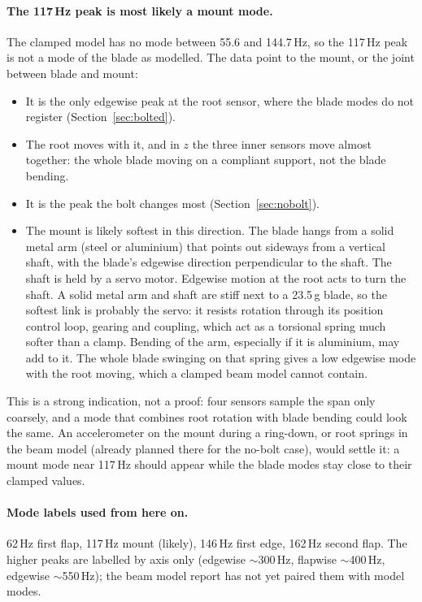 \documentclass[11pt]{article}
\begin{document}
\paragraph{The 117\,Hz peak is most likely a mount mode.} The clamped model
has no mode between 55.6 and 144.7\,Hz, so the 117\,Hz peak is not a mode of
the blade as modelled. The data point to the mount, or the joint between
blade and mount:
\begin{itemize}
  \item It is the only edgewise peak at the root sensor, where the blade
        modes do not register (Section~\ref{sec:bolted}).
  \item The root moves with it, and in $z$ the three inner sensors move
        almost together: the whole blade moving on a compliant support, not
        the blade bending.
  \item It is the peak the bolt changes most (Section~\ref{sec:nobolt}).
  \item The mount is likely softest in this direction. The blade hangs from
        a solid metal arm (steel or aluminium) that points out sideways from
        a vertical shaft, with the blade's edgewise direction perpendicular to
        the shaft. The shaft is held by a servo motor. Edgewise motion at the
        root acts to turn the shaft. A solid metal arm and shaft are stiff
        next to a 23.5\,g blade, so the softest link is probably the servo:
        it resists rotation through its position control loop, gearing and
        coupling, which act as a torsional spring much softer than a clamp.
        Bending of the arm, especially if it is aluminium, may add to it. The whole blade swinging on that spring gives a
        low edgewise mode with the root moving, which a clamped beam model
        cannot contain.
\end{itemize}
This is a strong indication, not a proof: four sensors sample the span only
coarsely, and a mode that combines root rotation with blade bending could
look the same. An accelerometer on the mount during a ring-down, or root
springs in the beam model (already planned there for the no-bolt case),
would settle it: a mount mode near 117\,Hz should appear while the blade
modes stay close to their clamped values.

\paragraph{Mode labels used from here on.} 62\,Hz first flap, 117\,Hz mount
(likely), 146\,Hz first edge, 162\,Hz second flap. The higher peaks are
labelled by axis only (edgewise $\sim$300\,Hz, flapwise $\sim$400\,Hz,
edgewise $\sim$550\,Hz); the beam model report has not yet paired them with
model modes.
\end{document}
